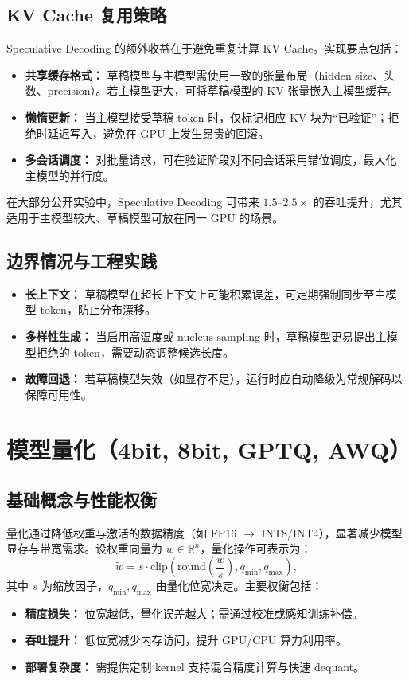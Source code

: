 \documentclass[UTF8,zihao=-4]{ctexart}
\begin{document}
\subsection{KV Cache 复用策略}
Speculative Decoding 的额外收益在于避免重复计算 KV Cache。实现要点包括：
\begin{itemize}
  \item \textbf{共享缓存格式：} 草稿模型与主模型需使用一致的张量布局（hidden size、头数、precision）。若主模型更大，可将草稿模型的 KV 张量嵌入主模型缓存。
  \item \textbf{懒惰更新：} 当主模型接受草稿 token 时，仅标记相应 KV 块为“已验证”；拒绝时延迟写入，避免在 GPU 上发生昂贵的回滚。
  \item \textbf{多会话调度：} 对批量请求，可在验证阶段对不同会话采用错位调度，最大化主模型的并行度。
\end{itemize}
在大部分公开实验中，Speculative Decoding 可带来 $1.5\text{--}2.5\times$ 的吞吐提升，尤其适用于主模型较大、草稿模型可放在同一 GPU 的场景。

\subsection{边界情况与工程实践}
\begin{itemize}
  \item \textbf{长上下文：} 草稿模型在超长上下文上可能积累误差，可定期强制同步至主模型 token，防止分布漂移。
  \item \textbf{多样性生成：} 当启用高温度或 nucleus sampling 时，草稿模型更易提出主模型拒绝的 token，需要动态调整候选长度。
  \item \textbf{故障回退：} 若草稿模型失效（如显存不足），运行时应自动降级为常规解码以保障可用性。
\end{itemize}

\section{模型量化（4bit, 8bit, GPTQ, AWQ）}
\subsection{基础概念与性能权衡}
量化通过降低权重与激活的数据精度（如 FP16 $\rightarrow$ INT8/INT4），显著减少模型显存与带宽需求。设权重向量为 $w \in \mathbb{R}^n$，量化操作可表示为：
\begin{equation}
  \tilde{w} = s \cdot \text{clip}\left(\text{round}\left(\frac{w}{s}\right), q_{\min}, q_{\max}\right),
\end{equation}
其中 $s$ 为缩放因子，$q_{\min}, q_{\max}$ 由量化位宽决定。主要权衡包括：
\begin{itemize}
  \item \textbf{精度损失：} 位宽越低，量化误差越大；需通过校准或感知训练补偿。
  \item \textbf{吞吐提升：} 低位宽减少内存访问，提升 GPU/CPU 算力利用率。
  \item \textbf{部署复杂度：} 需提供定制 kernel 支持混合精度计算与快速 dequant。
\end{itemize}
\end{document}
